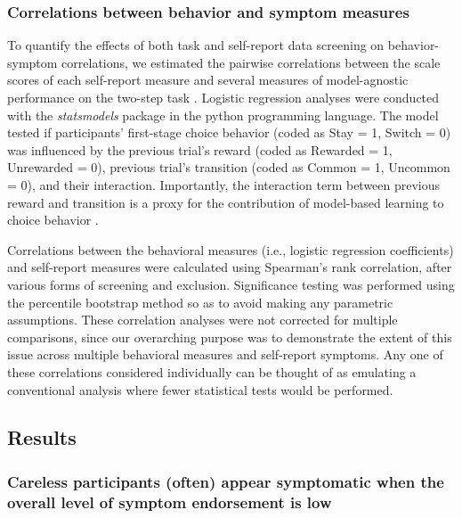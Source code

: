 \documentclass[a4paper,notitlepage,12pt]{article}
\begin{document}
\subsubsection*{Correlations between behavior and symptom measures}

To quantify the effects of both task and self-report data screening on behavior-symptom correlations, we estimated the pairwise correlations between the scale scores of each self-report measure and several measures of model-agnostic performance on the two-step task \cite{gillan2016characterizing}. Logistic regression analyses were conducted with the \textit{statsmodels} package \cite{seabold2010statsmodels} in the python programming language. The model tested if participants' first-stage choice behavior (coded as Stay = 1, Switch = 0) was influenced by the previous trial's reward (coded as Rewarded = 1, Unrewarded = 0), previous trial's transition (coded as Common = 1, Uncommon = 0), and their interaction. Importantly, the interaction term between previous reward and transition is a proxy for the contribution of model-based learning to choice behavior \cite{gillan2016characterizing}.

Correlations between the behavioral measures (i.e., logistic regression coefficients) and self-report measures were calculated using Spearman's rank correlation, after various forms of screening and exclusion. Significance testing was performed using the percentile bootstrap method \cite{wilcox2018guide-2} so as to avoid making any parametric assumptions. These correlation analyses were not corrected for multiple comparisons, since our overarching purpose was to demonstrate the extent of this issue across multiple behavioral measures and self-report symptoms. Any one of these correlations considered individually can be thought of as emulating a conventional analysis where fewer statistical tests would be performed.

\subsection*{Results}

\subsubsection*{Careless participants (often) appear symptomatic when the overall level of symptom endorsement is low}
\end{document}

